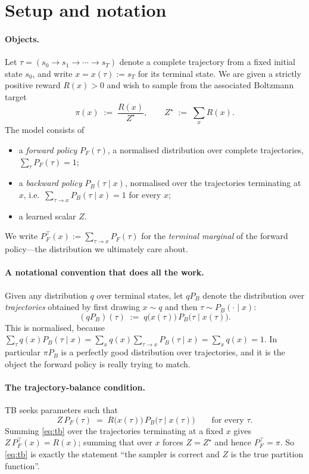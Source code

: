 \documentclass[11pt]{article}
\theoremstyle{plain}
\theoremstyle{definition}
\theoremstyle{remark}
\newcommand{\PF}{P_{F}}
\newcommand{\PB}{P_{B}}
\newcommand{\Zstar}{Z^{\star}}
\begin{document}
\section{Setup and notation}

\paragraph{Objects.}
Let $\tau = (s_0 \to s_1 \to \cdots \to s_T)$ denote a complete trajectory from a
fixed initial state $s_0$, and write $x = x(\tau) := s_T$ for its terminal state.
We are given a strictly positive reward $R(x) > 0$ and wish to sample from the
associated Boltzmann target
\[
  \pi(x) \;:=\; \frac{R(x)}{\Zstar},
  \qquad
  \Zstar \;:=\; \sum_{x} R(x).
\]
The model consists of
\begin{itemize}
  \item a \emph{forward policy} $\PF(\tau)$, a normalised distribution over
        complete trajectories, $\sum_\tau \PF(\tau) = 1$;
  \item a \emph{backward policy} $\PB(\tau \mid x)$, normalised over the
        trajectories terminating at $x$, i.e.\ $\sum_{\tau \to x} \PB(\tau\mid x) = 1$
        for every $x$;
  \item a learned scalar $Z$.
\end{itemize}
We write $\PF^{\top}(x) := \sum_{\tau \to x} \PF(\tau)$ for the \emph{terminal
marginal} of the forward policy---the distribution we ultimately care about.

\paragraph{A notational convention that does all the work.}
Given any distribution $q$ over terminal states, let $q\PB$ denote the
distribution over \emph{trajectories} obtained by first drawing $x \sim q$ and
then $\tau \sim \PB(\cdot \mid x)$:
\[
  (q\PB)(\tau) \;:=\; q\bigl(x(\tau)\bigr)\,\PB\bigl(\tau \mid x(\tau)\bigr).
\]
This is normalised, because $\sum_\tau q(x)\PB(\tau\mid x) = \sum_x q(x) \sum_{\tau\to x}\PB(\tau\mid x) = \sum_x q(x) = 1$.
In particular $\pi\PB$ is a perfectly good distribution over trajectories, and it
is the object the forward policy is really trying to match.

\paragraph{The trajectory-balance condition.}
TB seeks parameters such that
\begin{equation}\label{eq:tb}
  Z\,\PF(\tau) \;=\; R\bigl(x(\tau)\bigr)\,\PB\bigl(\tau \mid x(\tau)\bigr)
  \qquad \text{for every } \tau .
\end{equation}
Summing \eqref{eq:tb} over the trajectories terminating at a fixed $x$ gives
$Z\,\PF^{\top}(x) = R(x)$; summing that over $x$ forces $Z = \Zstar$ and hence
$\PF^{\top} = \pi$. So \eqref{eq:tb} is exactly the statement ``the sampler is
correct and $Z$ is the true partition function''.
\end{document}
